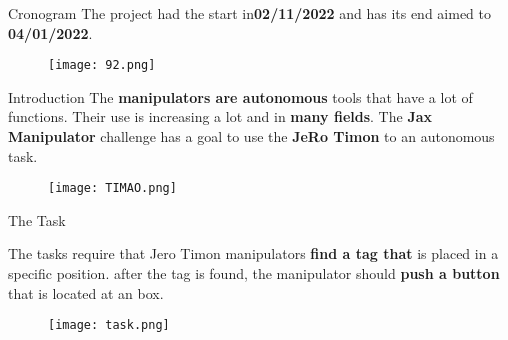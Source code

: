 \begin{frame}[t]{Cronogram} 
    The project had the start in\textbf{02/11/2022} and has its end aimed to \textbf{04/01/2022}.
    \begin{center}
            \begin{figure}
                \texttt{[image: 92.png]}
            \end{figure}
    \end{center}

       
\end{frame}


\begin{frame}[t]{Introduction} 
    \transdissolve[duration=0.5]
    The \textbf{manipulators are autonomous} tools that have a lot of functions. Their use is increasing a lot  and in \textbf{many fields}.
    The \textbf{Jax Manipulator} challenge has a goal to use the \textbf{JeRo Timon} to an autonomous  task.  


    \begin{center}
            \begin{figure}
                \texttt{[image: TIMAO.png]}
            \end{figure}
    \end{center}
       
\end{frame}

\begin{frame}[c]{The Task}

    The tasks require that Jero Timon manipulators \textbf{find a tag that}  is placed in a specific position.
    after the tag is found, the manipulator should \textbf{push a button} that is located at an box.

    \begin{center}
            \begin{figure}
                \texttt{[image: task.png]}
            \end{figure}
    \end{center}

\end{frame}



